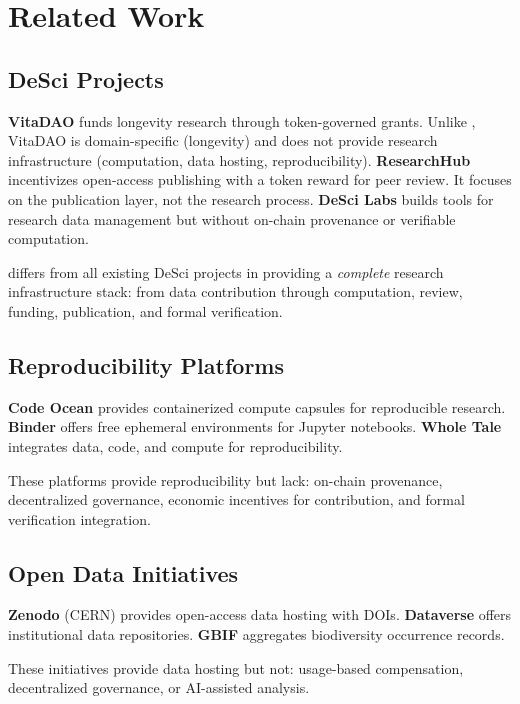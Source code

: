 \section{Related Work}

\label{sec:related}

\subsection{DeSci Projects}

\textbf{VitaDAO} funds longevity research through token-governed grants. Unlike \Zoo{}, VitaDAO is domain-specific (longevity) and does not provide research infrastructure (computation, data hosting, reproducibility). \textbf{ResearchHub} incentivizes open-access publishing with a token reward for peer review. It focuses on the publication layer, not the research process. \textbf{DeSci Labs} builds tools for research data management but without on-chain provenance or verifiable computation.

\Zoo{} differs from all existing DeSci projects in providing a \emph{complete} research infrastructure stack: from data contribution through computation, review, funding, publication, and formal verification.

\subsection{Reproducibility Platforms}

\textbf{Code Ocean} provides containerized compute capsules for reproducible research. \textbf{Binder} offers free ephemeral environments for Jupyter notebooks. \textbf{Whole Tale} integrates data, code, and compute for reproducibility.

These platforms provide reproducibility but lack: on-chain provenance, decentralized governance, economic incentives for contribution, and formal verification integration.

\subsection{Open Data Initiatives}

\textbf{Zenodo} (CERN) provides open-access data hosting with DOIs. \textbf{Dataverse} offers institutional data repositories. \textbf{GBIF} aggregates biodiversity occurrence records.

These initiatives provide data hosting but not: usage-based compensation, decentralized governance, or AI-assisted analysis.

